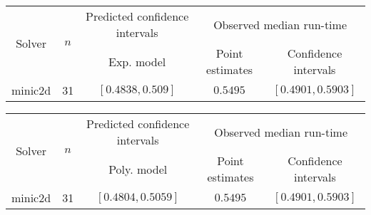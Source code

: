 \begin{tabular}{ccccc}
\hline 
\multirow{2}{*}{Solver} & \multirow{2}{*}{$n$} & Predicted confidence intervals & \multicolumn{2}{c}{Observed median  run-time}\tabularnewline
 &  & Exp. model  & Point estimates  & Confidence intervals\tabularnewline
\hline 
\hline 
\multirow{0}{*}{minic2d} & 31 & $\mathbf{\left[0.4838,0.509\right]}$ & $0.5495$ & $\left[0.4901,0.5903\right]$ \tabularnewline 
\hline 
\end{tabular} 

\begin{tabular}{ccccc}
\hline 
\multirow{2}{*}{Solver} & \multirow{2}{*}{$n$} & Predicted confidence intervals & \multicolumn{2}{c}{Observed median  run-time}\tabularnewline
 &  & Poly. model  & Point estimates  & Confidence intervals\tabularnewline
\hline 
\hline 
\multirow{0}{*}{minic2d} & 31 & $\mathbf{\left[0.4804,0.5059\right]}$ & $0.5495$ & $\left[0.4901,0.5903\right]$ \tabularnewline 
\hline 
\end{tabular} 


